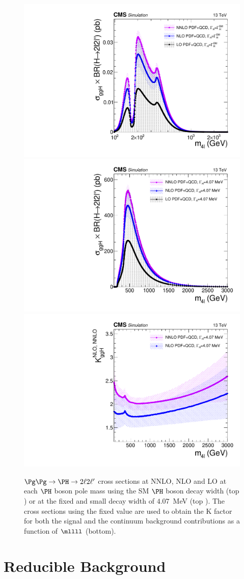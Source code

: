 \begin{figure}[!htb]
\centering
\includegraphics[width=0.48\linewidth]{Figures/IrrBkg/cCompare_hnnlo_ggHZZ2l2l_xsec.pdf}
\includegraphics[width=0.48\linewidth]{Figures/IrrBkg/cCompare_hnnlo_ggHZZ2l2l_narrowwidth_xsec.pdf}\\
\includegraphics[width=0.48\linewidth]{Figures/IrrBkg/cCompare_hnnlo_ggHZZ2l2l_narrowwidth_kfactor.pdf}
\caption{$\Pg\Pg\to\PH\to2\ell2\ell^\prime$ cross sections at NNLO, NLO and LO at each $\PH$ boson pole mass using the SM $\PH$ boson decay width  (top \cmsLeft) or at the fixed and small decay width of $4.07$~MeV (top \cmsRight). The cross sections using the fixed value are used to obtain the K factor for both the signal and the continuum background contributions as a function of $\mllll$ (bottom).
}
\label{fig:ggHZZXsecKfactor}
\end{figure}


\section{Reducible Background}
\label{sec:zxIntr}


